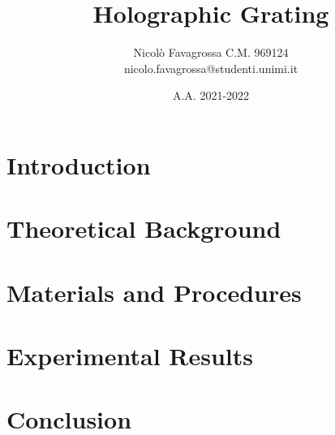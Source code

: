 \documentclass[11pt]{article}
\title{Holographic Grating}
\author{Nicolò Favagrossa C.M. 969124\\nicolo.favagrossa@studenti.unimi.it\\}
\date{A.A. 2021-2022}
\begin{document}
\maketitle
\newpage
\tableofcontents
\newpage
\section{Introduction}

\section{Theoretical Background}

\newpage
\section{Materials and Procedures}

\section{Experimental Results}

\section{Conclusion}

\end{document}
